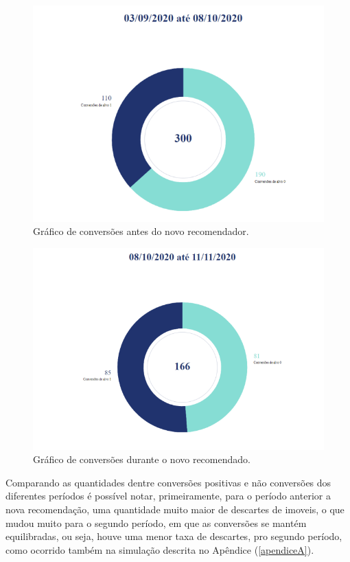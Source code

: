 \begin{figure}[H]
    \centering
    \includegraphics[scale=0.6]{figuras/desenvolvimento/grafico1.png}
    \caption[Gráfico de conversões antes do novo recomendador]{Gráfico de conversões antes do novo recomendador.}
    \label{fig:grafico1}
\end{figure}

\begin{figure}[H]
    \centering
    \includegraphics[scale=0.6]{figuras/desenvolvimento/grafico2.png}
    \caption[Gráfico de conversões durante o novo recomendador]{Gráfico de conversões durante o novo recomendado.}
    \label{fig:grafico2}
\end{figure}

Comparando as quantidades dentre conversões positivas e não conversões dos diferentes períodos é possível notar, primeiramente, para o período anterior a nova recomendação, uma quantidade muito maior de descartes de imoveis, o que mudou muito para o segundo período, em que as conversões se mantém equilibradas, ou seja, houve uma menor taxa de descartes, pro segundo período, como ocorrido também na simulação descrita no Apêndice (\ref{apendiceA}).

